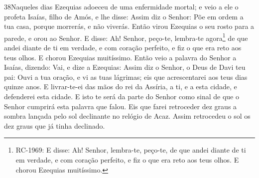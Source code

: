 \medskip

\lettrine{38}{}Naqueles dias Ezequias adoeceu de uma
enfermidade mortal; e veio a ele o profeta Isaías, filho de Amós, e
lhe disse: Assim diz o Senhor: Põe em ordem a tua casa, porque
morrerás, e não viverás. Então virou Ezequias o seu rosto para a
parede, e orou ao Senhor. E disse: Ah! Senhor, peço-te,
lembra-te agora\footnote{RC-1969: E disse: Ah! Senhor, lembra-te,
peço-te, de que andei diante de ti em verdade, e com coração
perfeito, e fiz o que era reto aos teus olhos. E chorou Ezequias
muitíssimo.} de que andei diante de ti em verdade, e com coração
perfeito, e fiz o que era reto aos teus olhos. E chorou Ezequias
muitíssimo. Então veio a palavra do Senhor a Isaías, dizendo:
Vai, e dize a Ezequias: Assim diz o Senhor, o Deus de Davi teu
pai: Ouvi a tua oração, e vi as tuas lágrimas; eis que acrescentarei
aos teus dias quinze anos. E livrar-te-ei das mãos do rei da
Assíria, a ti, e a esta cidade, e defenderei esta cidade. E isto
te será da parte do Senhor como sinal de que o Senhor cumprirá esta
palavra que falou. Eis que farei retroceder dez graus a sombra
lançada pelo sol declinante no relógio de Acaz. Assim retrocedeu o
sol os dez graus que já tinha declinado.

